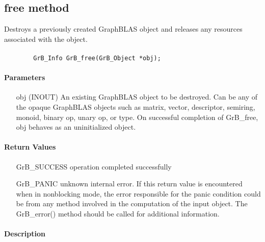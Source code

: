 \subsection{{\sf free} method}

Destroys a previously created GraphBLAS object and releases any resources associated with the object.

\paragraph{\syntax}

\begin{verbatim}
        GrB_Info GrB_free(GrB_Object *obj);
\end{verbatim}


\paragraph{Parameters}

\begin{itemize}[leftmargin=1.1in]
	\item[{\sf obj}] ({\sf INOUT}) An existing GraphBLAS object to be destroyed. 
    Can be any of the opaque GraphBLAS objects such as matrix, vector, descriptor, semiring, monoid, binary op, 
		unary op, or type. On successful completion of {\sf GrB\_free}, {\sf obj} behaves as an uninitialized object.
\end{itemize}

\paragraph{Return Values}

\begin{itemize}[leftmargin=2.1in]
\item[{\sf GrB\_SUCCESS}]        operation completed successfully
\item[{\sf GrB\_PANIC}]          unknown internal error.  If this return value is encountered
when in nonblocking mode, the error responsible for the panic condition could be from 
any method involved in the computation of the input object.  The GrB\_error() method 
should be called for additional information.
\end{itemize}

\paragraph{Description}

